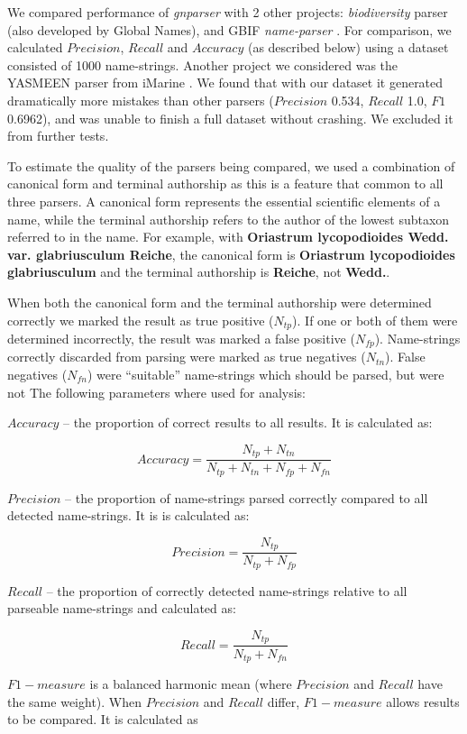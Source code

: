 \documentclass{bmcart}
\begin{document}
We compared performance of \textit{gnparser} with 2 other projects:
\textit{biodiversity} parser \cite{Boyle2013, biodiversity} (also developed by
Global Names), and GBIF \textit{name-parser} \cite{gbifNameParser}. For
comparison, we calculated $Precision$, $Recall$ and $Accuracy$ (as described
below) using a dataset consisted of 1000 name-strings. Another project we
considered was the YASMEEN parser from iMarine  \cite{VandenBerghe2015}. We found that with our dataset it generated dramatically more mistakes
than other parsers ($Precision$ 0.534, $Recall$ 1.0, $F1$ 0.6962), and was
unable to finish a full dataset without crashing. We excluded it from further tests.

To estimate the quality of the parsers being compared, we used a
combination of canonical form and terminal authorship as this is a feature that common to all three parsers.  A canonical form
represents the essential scientific elements of a name, while the terminal authorship
refers to the author of the lowest subtaxon referred to in the name. For
example, with \textbf{Oriastrum lycopodioides Wedd.  var.  glabriusculum Reiche}, the
canonical form is \textbf{Oriastrum lycopodioides glabriusculum} and the terminal
authorship is \textbf{Reiche}, not \textbf{Wedd.}.

 When both the canonical form and the terminal authorship were determined
correctly we marked the result as true positive ($N_{tp}$).  If one or both
of them were determined incorrectly, the result was marked a false positive
($N_{fp}$). Name-strings correctly discarded from parsing were marked as
true negatives ($N_{tn}$). False negatives ($N_{fn}$) were ``suitable''
name-strings which should be parsed, but were not The
following parameters where used for analysis:

$Accuracy$ -- the proportion of correct results to all results.  It is calculated
as:

\[Accuracy = \dfrac{N_{tp} + N_{tn}}{N_{tp} + N_{tn} + N_{fp} + N_{fn}}\]

$Precision$ -- the proportion of name-strings parsed correctly compared to all detected
name-strings. It is is calculated as:

\[Precision = \dfrac{N_{tp}}{N_{tp} + N_{fp}}\]

$Recall$ -- the proportion of correctly detected name-strings relative to all parseable
name-strings and calculated as:

\[Recall = \dfrac{N_{tp}}{N_{tp} + N_{fn}}\]

$F1-measure$ is a balanced harmonic mean (where $Precision$ and $Recall$ have
the same weight). When $Precision$ and $Recall$ differ, $F1-measure$ allows
results to be compared. It is calculated as
\end{document}
